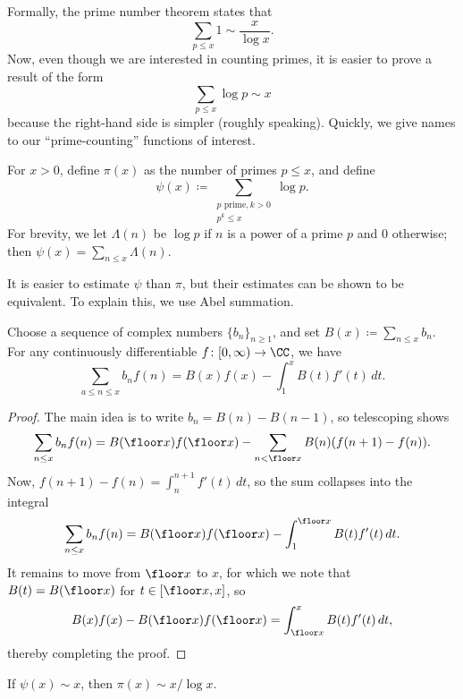 \documentclass[../thesis.tex]{subfiles}
\begin{document}
Formally, the prime number theorem states that
\[\sum_{p\le x}1\sim\frac x{\log x}.\]
%
Now, even though we are interested in counting primes, it is easier to prove a result of the form
\[\sum_{p\le x}\log p\sim x\]
because the right-hand side is simpler (roughly speaking). Quickly, we give names to our ``prime-counting'' functions of interest.
\begin{definition}
	For $x>0$, define $\pi(x)$ as the number of primes $p\le x$, and define
	\[\psi(x)\coloneqq\sum_{\substack{p\text{ prime},k>0\\p^k\le x}}\log p.\]
	For brevity, we let $\Lambda(n)$ be $\log p$ if $n$ is a power of a prime $p$ and $0$ otherwise; then $\psi(x)=\sum_{n\le x}\Lambda(n)$.
\end{definition}
It is easier to estimate $\psi$ than $\pi$, but their estimates can be shown to be equivalent. To explain this, we use Abel summation.
\begin{proposition} \label{prop:abel-sum}
	Choose a sequence of complex numbers $\{b_n\}_{n\ge1}$, and set $B(x)\coloneqq\sum_{n\le x}b_n$. For any continuously differentiable $f\colon[0,\infty)\to\CC$, we have
	\[\sum_{a\le n\le x}b_nf(n)=B(x)f(x)-\int_1^xB(t)f'(t)\,dt.\]
\end{proposition}
\begin{proof}
	The main idea is to write $b_n=B(n)-B(n-1)$, so telescoping shows
	\[\sum_{n\le x}b_nf(n)=B(\floor x)f(\floor x)-\sum_{n<\floor x}B(n)(f(n+1)-f(n)).\]
	Now, $f(n+1)-f(n)=\int_n^{n+1}f'(t)\,dt$, so the sum collapses into the integral
	\[\sum_{n\le x}b_nf(n)=B(\floor x)f(\floor x)-\int_1^{\floor x}B(t)f'(t)\,dt.\]
	It remains to move from $\floor x$ to $x$, for which we note that $B(t)=B(\floor x)$ for $t\in[\floor x,x]$, so
	\[B(x)f(x)-B(\floor x)f(\floor x)=\int_{\floor x}^xB(t)f'(t)\,dt,\]
	thereby completing the proof.
\end{proof}
\begin{corollary} \label{cor:pnt-by-chebychev}
	If $\psi(x)\sim x$, then $\pi(x)\sim x/\log x$.
\end{corollary}
\end{document}
